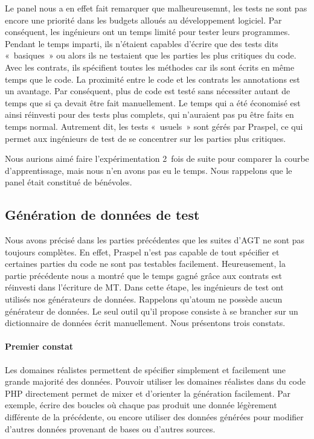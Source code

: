 Le panel nous a en effet fait remarquer que malheureusemnt, les tests ne sont
pas encore une priorité dans les budgets alloués au développement logiciel. Par
conséquent, les ingénieurs ont un temps limité pour tester leurs programmes.
Pendant le temps imparti, ils n'étaient capables d'écrire que des tests dits
«~basiques~» ou alors ils ne testaient que les parties les plus critiques du
code. Avec les contrats, ils spécifient toutes les méthodes car ils sont écrits
en même temps que le code. La proximité entre le code et les contrats \via les
annotations est un avantage. Par conséquent, plus de code est testé sans
nécessiter autant de temps que si ça devait être fait manuellement. Le temps qui
a été économisé est ainsi réinvesti pour des tests plus complets, qui n'auraient
pas pu être faits en temps normal. Autrement dit, les tests «~usuels~» sont
gérés par Praspel, ce qui permet aux ingénieurs de test de se concentrer sur les
parties plus critiques.

Nous aurions aimé faire l'expérimentation 2~fois de suite pour comparer la
courbe d'apprentissage, mais nous n'en avons pas eu le temps. Nous rappelons que
le panel était constitué de bénévoles.

\subsection{Génération de données de test}
\label{subsection:experimentation:data}


Nous avons précisé dans les parties précédentes que les suites d'AGT ne sont pas
toujours complètes. En effet, Praspel n'est pas capable de tout spécifier et
certaines parties du code ne sont pas testables facilement. Heureusement, la
partie précédente nous a montré que le temps gagné grâce aux contrats est
réinvesti dans l'écriture de MT. Dans cette étape, les ingénieurs de test ont
utilisés nos générateurs de données. Rappelons qu'atoum ne possède aucun
générateur de données. Le seul outil qu'il propose consiste à se brancher sur un
dictionnaire de données écrit manuellement. Nous présentons trois constats.

\paragraph{Premier constat} Les domaines réalistes permettent de spécifier
simplement et facilement une grande majorité des données. Pouvoir utiliser les
domaines réalistes dans du code PHP directement permet de mixer et d'orienter la
génération facilement. Par exemple, écrire des boucles où chaque pas produit une
donnée légèrement différente de la précédente, ou encore utiliser des données
générées pour modifier d'autres données provenant de bases ou d'autres sources.

